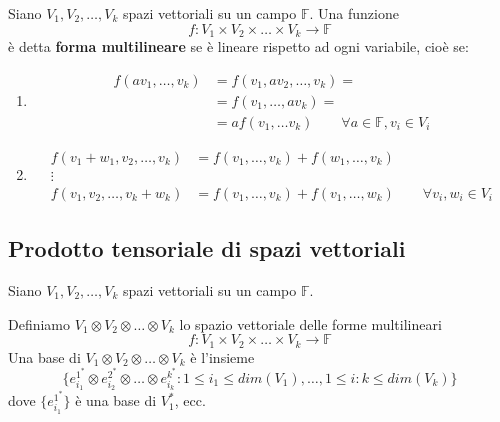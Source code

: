 \documentclass[../main.tex]{subfiles}
\begin{document}
\begin{definition}
    Siano $V_1, V_2, \ldots, V_k$ spazi vettoriali su un campo $\mathbb{F}$. Una funzione
    \begin{equation*}
        f : V_1 \times V_2 \times \ldots \times V_k \rightarrow \mathbb{F}
    \end{equation*}
    è detta \textbf{forma multilineare} se è lineare rispetto ad ogni variabile, cioè se:
    \begin{enumerate}
        \item \begin{align*}
                  f(av_1, \ldots ,v_k) & = f(v_1, a v_2, \ldots, v_k) =                                      \\
                                       & = f(v_1, \ldots, a v_k) =                                           \\
                                       & = a f(v_1, \ldots v_k) \qquad \forall a \in \mathbb{F}, v_i \in V_i
              \end{align*}
        \item \begin{align*}
                  f(v_1 + w_1, v_2, \ldots ,v_k) & = f(v_1, \ldots, v_k) + f(w_1, \ldots, v_k)                                 \\
                  \vdots                         &                                                                             \\
                  f(v_1, v_2, \ldots ,v_k + w_k) & = f(v_1, \ldots, v_k) + f(v_1, \ldots, w_k) \qquad \forall v_i, w_i \in V_i
              \end{align*}
    \end{enumerate}
\end{definition}

\subsection{Prodotto tensoriale di spazi vettoriali}
\begin{definition}
    Siano $V_1, V_2, \ldots, V_k$ spazi vettoriali su un campo $\mathbb{F}$.

    Definiamo $V_1 \otimes V_2 \otimes \ldots \otimes V_k$ lo spazio vettoriale delle forme multilineari
    \begin{equation*}
        f : V_1 \times V_2 \times \ldots \times V_k \rightarrow \mathbb{F}
    \end{equation*}
    Una base di $V_1 \otimes V_2 \otimes \ldots \otimes V_k$ è l'insieme
    \begin{equation*}
        \{e_{i_1}^{1^*} \otimes e_{i_2}^{2^*} \otimes \ldots \otimes e_{i_k}^{k^*} : 1 \leq i_1 \leq dim(V_1), \ldots , 1 \leq i:k \leq dim(V_k)\}
    \end{equation*}
    dove $\{e_{i_1}^{1^*}\}$ è una base di $V_1^*$, ecc.
\end{definition}
\end{document}
